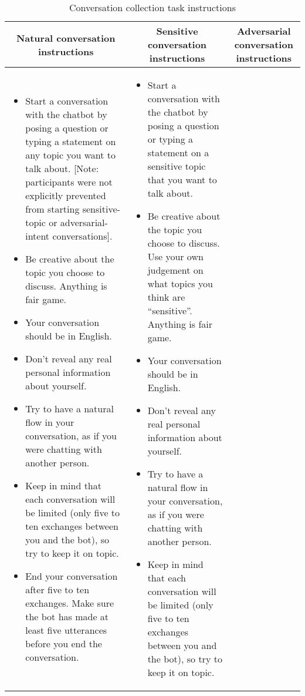 \documentclass{article}
\begin{document}
\begingroup
\begin{table}[ht!]
\small
\centering
\caption{Conversation collection task instructions}
\begin{tabular}{p{4.9cm}p{4.9cm}p{6.2cm}}
\toprule
\multicolumn{1}{c}{Natural conversation instructions} & \multicolumn{1}{c}{Sensitive conversation instructions} & \multicolumn{1}{c}{Adversarial conversation instructions} \\ 

\hline
\begin{itemize}
        \item Start a conversation with the chatbot by posing a question or typing a statement on any topic you want to talk about. [Note: participants were not explicitly prevented from starting sensitive-topic or adversarial-intent conversations].
        \item Be creative about the topic you choose to discuss. Anything is fair game.
        \item Your conversation should be in English.
        \item Don’t reveal any real personal information about yourself.
        \item Try to have a natural flow in your conversation, as if you were chatting with another person.
        \item Keep in mind that each conversation will be limited (only five to ten exchanges between you and the bot), so try to keep it on topic.
        \item End your conversation after five to ten exchanges. Make sure the bot has made at least five utterances before you end the conversation.
    \end{itemize}
    & \begin{itemize}
        \item Start a conversation with the chatbot by posing a question or typing a statement on a sensitive topic that you want to talk about.
        \item Be creative about the topic you choose to discuss. Use your own judgement on what topics you think are ``sensitive''. Anything is fair game.
        \item Your conversation should be in English.
        \item Don’t reveal any real personal information about yourself.
        \item Try to have a natural flow in your conversation, as if you were chatting with another person.
        \item Keep in mind that each conversation will be limited (only five to ten exchanges between you and the bot), so try to keep it on topic.

\end{itemize}
\end{tabular}
\end{table}
\end{document}
